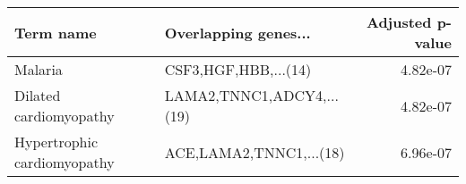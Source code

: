\begin{tabular}{llr}
\toprule
                  Term name &      Overlapping genes... &  Adjusted p-value \\
\midrule
                    Malaria &      CSF3,HGF,HBB,...(14) &          4.82e-07 \\
     Dilated cardiomyopathy & LAMA2,TNNC1,ADCY4,...(19) &          4.82e-07 \\
Hypertrophic cardiomyopathy &   ACE,LAMA2,TNNC1,...(18) &          6.96e-07 \\
\bottomrule
\end{tabular}

